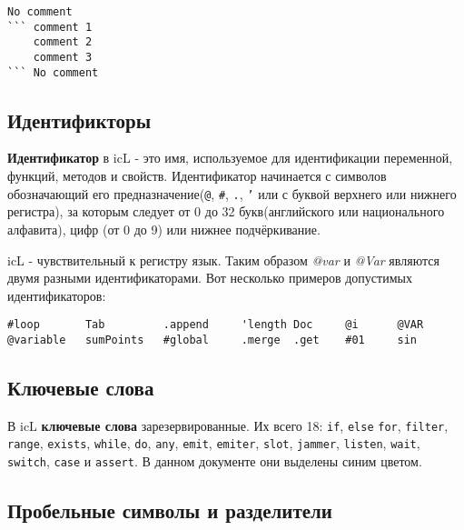 \begin{sourcecode}
\label{multilinecomment}
\begin{verbatim}
No comment
``` comment 1
	comment 2
	comment 3
``` No comment
\end{verbatim}
\end{sourcecode}

\subsection{Идентификторы}

\textbf{Идентификатор} в icL - это имя, используемое для идентификации переменной, функций, методов и свойств. Идентификатор начинается с символов обозначающий его предназначение(\texttt{@}, \texttt{#}, \texttt{.}, \texttt{'} или с буквой верхнего или нижнего регистра), за которым следует от 0 до 32 букв(английского или национального алфавита), цифр (от 0 до 9) или нижнее подчёркивание.

icL - чувствительный к регистру язык. Таким образом \textit{@var} и \textit{@Var} являются двумя разными идентификаторами. Вот несколько примеров допустимых идентификаторов:

\begin{verbatim}
#loop		Tab		    .append		'length	Doc	    @i	 	@VAR
@variable	sumPoints	#global		.merge	.get	#01		sin
\end{verbatim}

\subsection{Ключевые слова}

В icL \textbf{ключевые слова} зарезервированные. Их всего 18: \texttt{if}, \texttt{else} \texttt{for}, \texttt{filter}, \texttt{range}, \texttt{exists}, \texttt{while}, \texttt{do}, \texttt{any}, \texttt{emit}, \texttt{emiter}, \texttt{slot}, \texttt{jammer}, \texttt{listen}, \texttt{wait}, \texttt{switch}, \texttt{case} и \texttt{assert}. В данном документе они выделены синим цветом.

\subsection{Пробельные символы и разделители}

